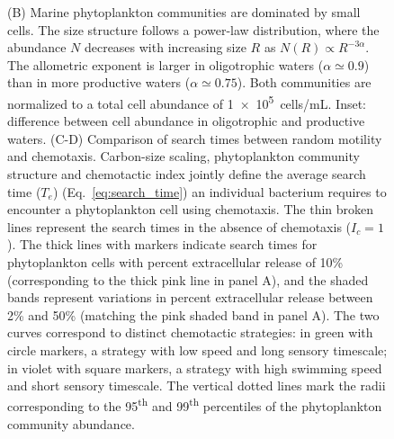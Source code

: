 \documentclass[9pt,twocolumn,twoside]{pnas-new}
\begin{document}
\begin{figure}
{        %
        (B) Marine phytoplankton communities are dominated by small cells. The size structure follows a power-law distribution, where the abundance $N$ decreases with increasing size $R$ as $N(R) \propto R^{-3\alpha}$.
        The allometric exponent is larger in oligotrophic waters ($\alpha\simeq 0.9$) than in more productive waters ($\alpha\simeq 0.75$). Both  communities are normalized to a total cell abundance of \SI{1e5}{cells/\milli\liter}.
        Inset: difference between cell abundance in oligotrophic and productive waters.
        (C-D) Comparison of search times between random motility and chemotaxis.
        Carbon-size scaling, phytoplankton community structure and chemotactic index jointly define the average search time ($T_e$) (Eq.~\ref{eq:search_time}) an individual bacterium requires to encounter a phytoplankton cell using chemotaxis.
        The thin broken lines represent the search times in the absence of chemotaxis ($I_c=1$).
        The thick lines with markers indicate search times for phytoplankton cells with percent extracellular release of 10\% (corresponding to the thick pink line in panel A), and the shaded bands represent variations in percent extracellular release between 2\% and 50\% (matching the pink shaded band in panel A).
        The two curves correspond to distinct chemotactic strategies: in green with circle markers, a strategy with low speed and long sensory timescale; in violet with square markers, a strategy with high swimming speed and short sensory timescale.
        The vertical dotted lines mark the radii corresponding to the 95\textsuperscript{th} and 99\textsuperscript{th} percentiles of the phytoplankton community abundance.
    }
    \label{fig:ecology}
\end{figure}
\end{document}
